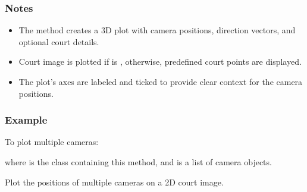 \documentclass[letterpaper,10pt,english]{sphinxmanual}
\begin{document}
\begin{fulllineitems}
\begin{fulllineitems}
\begin{quote}
\begin{description}
\end{description}\end{quote}
\subsubsection*{Notes}
\begin{itemize}
\item {} 
\sphinxAtStartPar
The method creates a 3D plot with camera positions, direction vectors, and
optional court details.

\item {} 
\sphinxAtStartPar
Court image is plotted if  is , otherwise, predefined
court points are displayed.

\item {} 
\sphinxAtStartPar
The plot’s axes are labeled and ticked to provide clear context for the camera
positions.

\end{itemize}
\subsubsection*{Example}

\sphinxAtStartPar
To plot multiple cameras:

\begin{sphinxVerbatim}[commandchars=\\\{\}]
  
\end{sphinxVerbatim}

\sphinxAtStartPar
where  is the class containing this method, and  is a list
of camera objects.

\end{fulllineitems}


\begin{fulllineitems}
\label{\detokenize{CameraUtils:id19}}
\pysigstartsignatures
{}
\pysigstopsignatures
\sphinxAtStartPar
Plot the positions of multiple cameras on a 2D court image.


\end{fulllineitems}
\end{fulllineitems}
\end{document}
